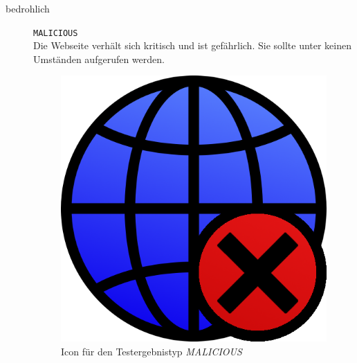 \begin{description}
    \item[bedrohlich] \hfill \texttt{MALICIOUS} \\
    Die Webseite verhält sich kritisch und ist gefährlich.
    Sie sollte unter keinen Umständen aufgerufen werden.
    \begin{figure}[H]
    	\centering
    	\includegraphics[scale=0.2]{images/webifier-malicious}
    	\caption{Icon für den Testergebnistyp \textit{MALICIOUS}}
    \end{figure}


\end{description}
